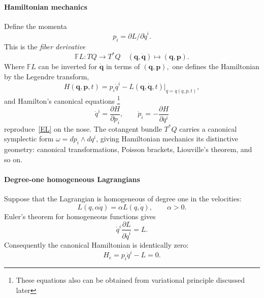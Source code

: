 \paragraph{Hamiltonian mechanics}
Define the momenta 
\[p_i = \partial L/\partial \dot q^i.\]
This is the \emph{fiber derivative} 
\[\mathbb{F}L: TQ \to T^*Q \quad (\bm q,\dot {\bm q})\mapsto (\bm q, \bm p).\]
Where $\mathbb{F}L$ can be inverted for $\dot {\bm q}$ in terms of $(\bm q,\bm p)$,\
one defines the Hamiltonian by the Legendre transform,
\begin{equation}
    H(\bm q,\bm p,t) = p_i \dot q^i - 
    L(\bm q,\dot {\bm q}, t)\Big|_{\dot q = \dot q(q,p,t)} ,
\end{equation}
and Hamilton's canonical equations \footnote{ These equations also can 
be obtained from variational principle discussed later}
\begin{equation}
\label{Ham}
\dot q^i = \frac{\partial H}{\partial p_i}, \qquad 
    \dot p_i = -\frac{\partial H}{\partial q^i}
\end{equation}
reproduce~\eqref{EL} on the nose. The cotangent bundle $T^*Q$ carries a
canonical symplectic form $\omega = dp_i \wedge dq^i$, giving Hamiltonian
mechanics its distinctive geometry: canonical transformations, Poisson
brackets, Liouville's theorem, and so on.

\paragraph{Degree-one homogeneous Lagrangians}
Suppose that the Lagrangian is homogeneous of degree one in the velocities:
\[L(q,\alpha\dot q)=\alpha L(q,\dot q),\qquad \alpha>0.\]
Euler's theorem for homogeneous functions gives
\[\dot q^i\frac{\partial L}{\partial\dot q^i}=L.\]
Consequently the canonical Hamiltonian is identically zero:
\[H_{\mathrm c}=p_i\dot q^i-L=0.\]

